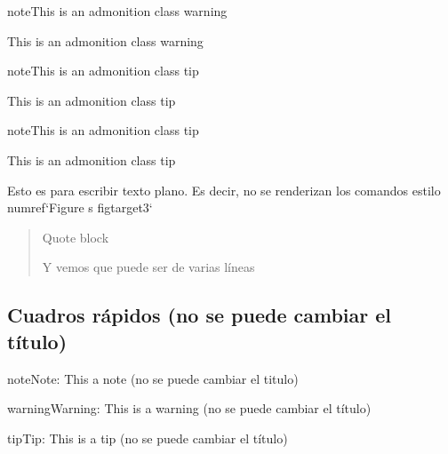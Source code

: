 \documentclass[letterpaper,10pt,english]{jupyterBook}
\begin{document}
\begin{sphinxadmonition}{note}{This is an admonition class warning}

\sphinxAtStartPar
This is an admonition class warning
\end{sphinxadmonition}

\begin{sphinxadmonition}{note}{This is an admonition class tip}

\sphinxAtStartPar
This is an admonition class tip
\end{sphinxadmonition}

\begin{sphinxadmonition}{note}{This is an admonition class tip}

\sphinxAtStartPar
This is an admonition class tip
\end{sphinxadmonition}

\begin{sphinxVerbatim}[commandchars=\\\{\}]
Esto es para escribir texto plano. Es decir, no se renderizan 
los comandos estilo \PYGZob{}numref\PYGZcb{}`Figure \PYGZpc{}s \PYGZlt{}fig\PYGZhy{}target\PYGZus{}3\PYGZgt{}`
\end{sphinxVerbatim}
\begin{quote}

\sphinxAtStartPar
Quote block

\sphinxAtStartPar
Y vemos que puede ser de varias líneas
\end{quote}


\subsection{Cuadros rápidos (no se puede cambiar el título)}
\label{\detokenize{docs/02_01_Cuadros:cuadros-rapidos-no-se-puede-cambiar-el-titulo}}
\begin{sphinxadmonition}{note}{Note:}
\sphinxAtStartPar
This a note (no se puede cambiar el titulo)
\end{sphinxadmonition}

\begin{sphinxadmonition}{warning}{Warning:}
\sphinxAtStartPar
This is a warning (no se puede cambiar el título)
\end{sphinxadmonition}

\begin{sphinxadmonition}{tip}{Tip:}
\sphinxAtStartPar
This is a tip (no se puede cambiar el título)
\end{sphinxadmonition}
\end{document}
